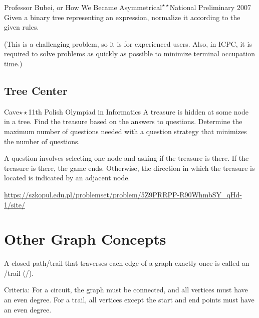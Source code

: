 \begin{pbox}{Professor Bubei, or How We Became Asymmetrical\textsuperscript{\scriptsize $\star\star$}}{National Preliminary 2007}
Given a binary tree representing an expression, normalize it according to the given rules.

\end{pbox}

(This is a challenging problem, so it is for experienced users. Also, in ICPC, it is required to solve problems as quickly as possible to minimize terminal occupation time.)
\subsection{Tree Center}

\begin{pbox}{Cave$\star\star$}{11th Polish Olympiad in Informatics}
A treasure is hidden at some node in a tree. Find the treasure based on the answers to questions. Determine the maximum number of questions needed with a question strategy that minimizes the number of questions.

A question involves selecting one node and asking if the treasure is there.
If the treasure is there, the game ends. Otherwise, the direction in which the treasure
is located is indicated by an adjacent node.

\url{https://szkopul.edu.pl/problemset/problem/5Z9PRRPP-R90WhmbSY_qHd-1/site/}
\end{pbox}


\begin{versionalpha}



\end{versionalpha}
\section{Other Graph Concepts}
A closed path/trail that traverses each edge of a graph exactly once is called an /trail (/).

Criteria: For a circuit, the graph must be connected, and all vertices must have an even degree. For a trail, all vertices except the start and end points must have an even degree.

